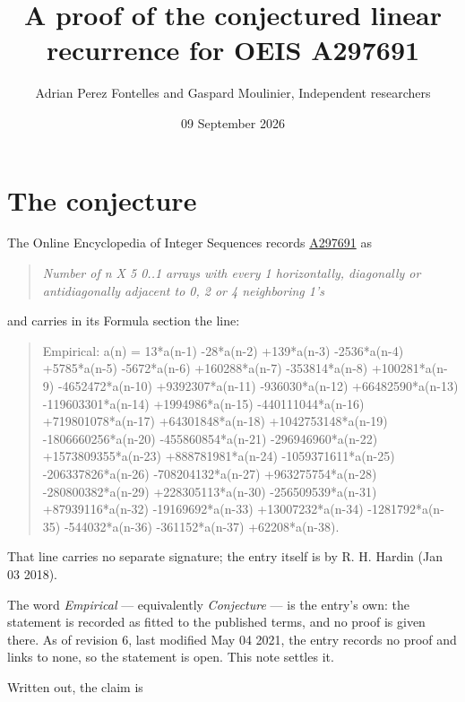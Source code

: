 \documentclass[11pt]{article}
\title{A proof of the conjectured linear recurrence for OEIS A297691}
\author{Adrian Perez Fontelles and Gaspard Moulinier, Independent researchers}
\date{09 September 2026}
\theoremstyle{definition}
\begin{document}
\maketitle
\section{The conjecture}

The Online Encyclopedia of Integer Sequences records \href{https://oeis.org/A297691}{A297691} as

\begin{quote}\itshape Number of n X 5 0..1 arrays with every 1 horizontally, diagonally or antidiagonally adjacent to 0, 2 or 4 neighboring 1's\end{quote}

and carries in its Formula section the line:

\begin{quote}\ttfamily Empirical: a(n) = 13*a(n-1) -28*a(n-2) +139*a(n-3) -2536*a(n-4) +5785*a(n-5) -5672*a(n-6) +160288*a(n-7) -353814*a(n-8) +100281*a(n-9) -4652472*a(n-10) +9392307*a(n-11) -936030*a(n-12) +66482590*a(n-13) -119603301*a(n-14) +1994986*a(n-15) -440111044*a(n-16) +719801078*a(n-17) +64301848*a(n-18) +1042753148*a(n-19) -1806660256*a(n-20) -455860854*a(n-21) -296946960*a(n-22) +1573809355*a(n-23) +888781981*a(n-24) -1059371611*a(n-25) -206337826*a(n-26) -708204132*a(n-27) +963275754*a(n-28) -280800382*a(n-29) +228305113*a(n-30) -256509539*a(n-31) +87939116*a(n-32) -19169692*a(n-33) +13007232*a(n-34) -1281792*a(n-35) -544032*a(n-36) -361152*a(n-37) +62208*a(n-38).\end{quote}

That line carries no separate signature; the entry itself is by R. H. Hardin (Jan 03 2018).

The word {\itshape Empirical} --- equivalently {\itshape Conjecture} --- is the entry's own: the statement is recorded as fitted to the published terms, and no proof is given there. As of revision 6, last modified May 04 2021, the entry records no proof and links to none, so the statement is open. This note settles it.

Written out, the claim is
\end{document}
